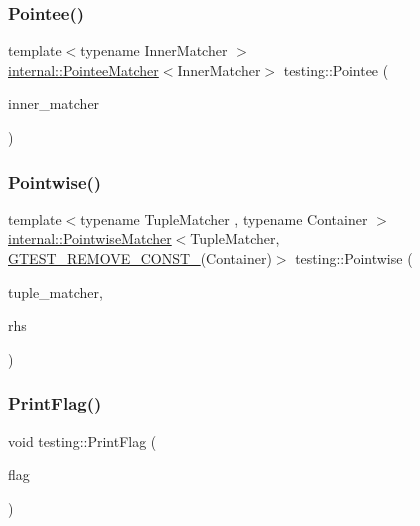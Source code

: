 \mbox{\label{namespacetesting_a5122ca3533f3a00f67e146dd81f3b68c}} 
\subsubsection{\texorpdfstring{Pointee()}{Pointee()}}
{\footnotesize\ttfamily template$<$typename Inner\+Matcher $>$ \\
\hyperlink{classtesting_1_1internal_1_1_pointee_matcher}{internal\+::\+Pointee\+Matcher}$<$Inner\+Matcher$>$ testing\+::\+Pointee (\begin{DoxyParamCaption}\item[{const Inner\+Matcher \&}]{inner\+\_\+matcher }\end{DoxyParamCaption})\hspace{0.3cm}{\ttfamily [inline]}}

\mbox{\label{namespacetesting_a51ee81f6f1723f7a7aff0429b1d76ec1}} 
\subsubsection{\texorpdfstring{Pointwise()}{Pointwise()}}
{\footnotesize\ttfamily template$<$typename Tuple\+Matcher , typename Container $>$ \\
\hyperlink{classtesting_1_1internal_1_1_pointwise_matcher}{internal\+::\+Pointwise\+Matcher}$<$Tuple\+Matcher, \hyperlink{gtest-internal_8h_a2ffec8c60510eb130af387f5ce9a756a}{G\+T\+E\+S\+T\+\_\+\+R\+E\+M\+O\+V\+E\+\_\+\+C\+O\+N\+S\+T\+\_\+}(Container)$>$ testing\+::\+Pointwise (\begin{DoxyParamCaption}\item[{const Tuple\+Matcher \&}]{tuple\+\_\+matcher,  }\item[{const Container \&}]{rhs }\end{DoxyParamCaption})\hspace{0.3cm}{\ttfamily [inline]}}

\mbox{\label{namespacetesting_a9863402455bfcf9be5fc0b1453a6d97d}} 
\subsubsection{\texorpdfstring{Print\+Flag()}{PrintFlag()}}
{\footnotesize\ttfamily void testing\+::\+Print\+Flag (\begin{DoxyParamCaption}\item[{const char $\ast$}]{flag }\end{DoxyParamCaption})}

